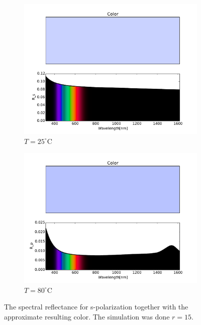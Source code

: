 %
%
\begin{figure}[h!]
    \centering
    \begin{subfigure}[b]{0.49\textwidth}
        \centering
        \includegraphics[width=\textwidth]{Results/Sim3/Rs_color25C.pdf}
        \caption{$T = 25^{\circ}$C}
        \label{fig:RsColor25C}
    \end{subfigure}
    \begin{subfigure}[b]{0.49\textwidth}
        \centering
        \includegraphics[width=\textwidth]{Results/Sim3/Rp_color80C.pdf}
        \caption{$T = 80^{\circ}$C}
        \label{fig:RsColor80C}
    \end{subfigure}
    \caption{
       The spectral reflectance for s-polarization together with the approximate resulting color.
       The simulation was done $r = 15$.
    }
    \label{fig:RsColor}
\end{figure}
